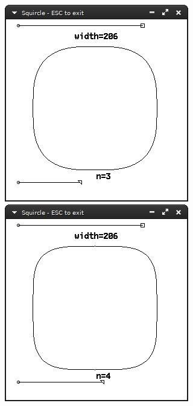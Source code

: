 \documentclass[12pt,openany,a4,usenames,dvipsnames]{book}
\begin{document}
\begin{figure}[H]
  \centering
  \begin{minipage}{0.49\textwidth}
    \includegraphics[width=\textwidth,keepaspectratio]{figures/squircle_3.png}
  \end{minipage}
  \hspace{.1em}
  \begin{minipage}{0.49\textwidth}
    \includegraphics[width=\textwidth,keepaspectratio]{figures/squircle_4.png}
  \end{minipage}
\end{figure}
\end{document}

